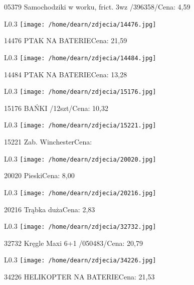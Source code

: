 05379 Samochodziki w worku, frict. 3wz /396358/Cena: 4,59\newline
\begin{wrapfigure}{L}{0.3\textwidth}
\texttt{[image: /home/dearn/zdjecia/14476.jpg]}
\end{wrapfigure}
14476 PTAK NA BATERIECena: 21,59\newline
\begin{wrapfigure}{L}{0.3\textwidth}
\texttt{[image: /home/dearn/zdjecia/14484.jpg]}
\end{wrapfigure}
14484 PTAK NA BATERIECena: 13,28\newline
\begin{wrapfigure}{L}{0.3\textwidth}
\texttt{[image: /home/dearn/zdjecia/15176.jpg]}
\end{wrapfigure}
15176 BAŃKI /12szt/Cena: 10,32\newline
\begin{wrapfigure}{L}{0.3\textwidth}
\texttt{[image: /home/dearn/zdjecia/15221.jpg]}
\end{wrapfigure}
15221 Zab. WinchesterCena: \newline
\begin{wrapfigure}{L}{0.3\textwidth}
\texttt{[image: /home/dearn/zdjecia/20020.jpg]}
\end{wrapfigure}
20020 PieskiCena: 8,00\newline
\begin{wrapfigure}{L}{0.3\textwidth}
\texttt{[image: /home/dearn/zdjecia/20216.jpg]}
\end{wrapfigure}
20216 Trąbka dużaCena: 2,83\newline
\begin{wrapfigure}{L}{0.3\textwidth}
\texttt{[image: /home/dearn/zdjecia/32732.jpg]}
\end{wrapfigure}
32732 Kręgle Maxi 6+1 /050483/Cena: 20,79\newline
\begin{wrapfigure}{L}{0.3\textwidth}
\texttt{[image: /home/dearn/zdjecia/34226.jpg]}
\end{wrapfigure}
34226 HELIKOPTER NA BATERIECena: 21,53\newline
